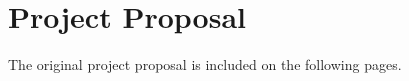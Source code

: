 \documentclass[00-main.tex]{subfiles}
\begin{document}
\chapter{Project Proposal}

The original project proposal is included on the following pages.


\end{document}
